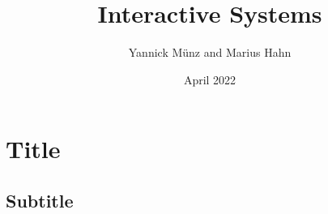 \documentclass{article}
\title{Interactive Systems}
\author{Yannick Münz and Marius Hahn}
\date{April 2022}
\begin{document}
\maketitle
\section*{Title}
\subsection*{Subtitle}
\end{document}
